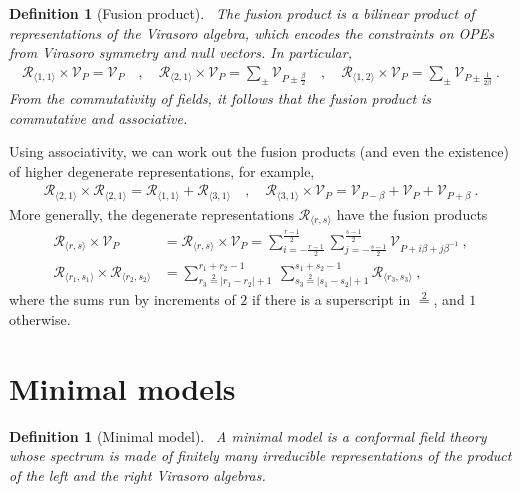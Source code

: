 \documentclass[12pt, a4paper]{article}
\theoremstyle{break}
\newtheorem{defn}[exo]{Definition}
\begin{document}
\begin{defn}[Fusion product]
 ~\label{def:fus}
 The fusion product is a bilinear product of representations of the Virasoro algebra, which encodes the constraints on OPEs from Virasoro symmetry and null vectors. In particular,
 \begin{align}
  \mathcal{R}_{\langle 1,1\rangle}\times \mathcal V_P = \mathcal V_P \quad , \quad 
  \mathcal{R}_{\langle 2,1\rangle}\times \mathcal V_P = \sum_\pm \mathcal V_{P\pm \frac{\beta}{2}}\quad , \quad  
  \mathcal{R}_{\langle 1,2\rangle}\times \mathcal V_P = \sum_\pm \mathcal V_{P\pm \frac{1}{2\beta}}\ .
  \label{eq:rv}
 \end{align}
 From the commutativity of fields, it follows that the fusion product is commutative and associative.
\end{defn}
Using associativity, we can work out the fusion products (and even the existence) of higher degenerate representations, for example, 
\begin{align}
 \mathcal{R}_{\langle 2,1\rangle}\times \mathcal{R}_{\langle 2,1\rangle} = \mathcal{R}_{\langle 1,1\rangle} + \mathcal{R}_{\langle 3,1\rangle} \quad , \quad \mathcal{R}_{\langle 3,1\rangle} \times \mathcal V_P = \mathcal V_{P - \beta} + \mathcal V_P + \mathcal V_{P + \beta}\ .
\end{align}
More generally, the degenerate representations $\mathcal{R}_{\langle r,s \rangle}$ have the fusion products
 \begin{align}
 \mathcal{R}_{\langle r,s \rangle}\times \mathcal{V}_P &= \mathcal{R}_{\langle r,s \rangle}\times \mathcal{V}_P = \sum_{i=-\frac{r-1}{2}}^{\frac{r-1}{2}} \sum_{j=-\frac{s-1}{2}}^{\frac{s-1}{2}} \mathcal{V}_{P + i\beta+j\beta^{-1}}\ ,
\label{rtv}
 \\
 \mathcal{R}_{\langle r_1,s_1 \rangle} \times \mathcal{R}_{\langle r_2,s_2 \rangle} &= \sum_{r_3\overset{2}{=}|r_1-r_2|+1}^{r_1+r_2-1}\ \sum_{s_3\overset{2}{=}|s_1-s_2|+1}^{s_1+s_2-1} \mathcal{R}_{\langle r_3,s_3 \rangle}\ ,
\label{rrsr}
\end{align}
where the sums run by increments of $2$ if there is a superscript in $\overset{2}{=}$, and $1$ otherwise.

\section{Minimal models}

\begin{defn}[Minimal model]
 ~\label{def:mm}
 A minimal model is a conformal field theory whose spectrum is made of finitely many irreducible representations of the product of the left and the right Virasoro algebras.
\end{defn}
\end{document}
